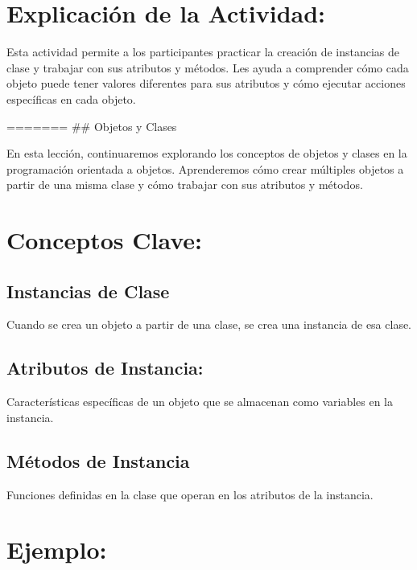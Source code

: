 \documentclass[
  a4paper,
  onepage,
  openany]{scrreprt}
\begin{document}
\hypertarget{explicaciuxf3n-de-la-actividad-48}{%
\section{Explicación de la
Actividad:}\label{explicaciuxf3n-de-la-actividad-48}}

Esta actividad permite a los participantes practicar la creación de
instancias de clase y trabajar con sus atributos y métodos. Les ayuda a
comprender cómo cada objeto puede tener valores diferentes para sus
atributos y cómo ejecutar acciones específicas en cada objeto.

======= \#\# Objetos y Clases

En esta lección, continuaremos explorando los conceptos de objetos y
clases en la programación orientada a objetos. Aprenderemos cómo crear
múltiples objetos a partir de una misma clase y cómo trabajar con sus
atributos y métodos.

\hypertarget{conceptos-clave-51}{%
\section{Conceptos Clave:}\label{conceptos-clave-51}}

\hypertarget{instancias-de-clase-1}{%
\subsection{Instancias de Clase}\label{instancias-de-clase-1}}

Cuando se crea un objeto a partir de una clase, se crea una instancia de
esa clase.

\hypertarget{atributos-de-instancia-1}{%
\subsection{Atributos de Instancia:}\label{atributos-de-instancia-1}}

Características específicas de un objeto que se almacenan como variables
en la instancia.

\hypertarget{muxe9todos-de-instancia-1}{%
\subsection{Métodos de Instancia}\label{muxe9todos-de-instancia-1}}

Funciones definidas en la clase que operan en los atributos de la
instancia.

\hypertarget{ejemplo-51}{%
\section{Ejemplo:}\label{ejemplo-51}}
\end{document}
